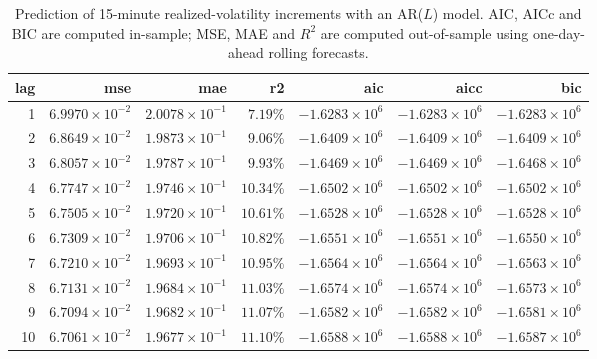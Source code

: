 \documentclass[ecta,nameyear,draft]{econsocart}
\newcommand{\1}{\mathbf 1}
\numberwithin{equation}{section}
\begin{document}
\begin{table}[htbp]
\centering

\begin{tabular}{rrrrrrr}
\toprule
lag & mse & mae & r2 & aic & aicc & bic \\
\midrule
1  & $6.9970 \times 10^{-2}$ & $2.0078 \times 10^{-1}$ & $7.19\%$  & $-1.6283 \times 10^{6}$ & $-1.6283 \times 10^{6}$ & $-1.6283 \times 10^{6}$ \\
2  & $6.8649 \times 10^{-2}$ & $1.9873 \times 10^{-1}$ & $9.06\%$  & $-1.6409 \times 10^{6}$ & $-1.6409 \times 10^{6}$ & $-1.6409 \times 10^{6}$ \\
3  & $6.8057 \times 10^{-2}$ & $1.9787 \times 10^{-1}$ & $9.93\%$  & $-1.6469 \times 10^{6}$ & $-1.6469 \times 10^{6}$ & $-1.6468 \times 10^{6}$ \\
4  & $6.7747 \times 10^{-2}$ & $1.9746 \times 10^{-1}$ & $10.34\%$ & $-1.6502 \times 10^{6}$ & $-1.6502 \times 10^{6}$ & $-1.6502 \times 10^{6}$ \\
5  & $6.7505 \times 10^{-2}$ & $1.9720 \times 10^{-1}$ & $10.61\%$ & $-1.6528 \times 10^{6}$ & $-1.6528 \times 10^{6}$ & $-1.6528 \times 10^{6}$ \\
6  & $6.7309 \times 10^{-2}$ & $1.9706 \times 10^{-1}$ & $10.82\%$ & $-1.6551 \times 10^{6}$ & $-1.6551 \times 10^{6}$ & $-1.6550 \times 10^{6}$ \\
7  & $6.7210 \times 10^{-2}$ & $1.9693 \times 10^{-1}$ & $10.95\%$ & $-1.6564 \times 10^{6}$ & $-1.6564 \times 10^{6}$ & $-1.6563 \times 10^{6}$ \\
8  & $6.7131 \times 10^{-2}$ & $1.9684 \times 10^{-1}$ & $11.03\%$ & $-1.6574 \times 10^{6}$ & $-1.6574 \times 10^{6}$ & $-1.6573 \times 10^{6}$ \\
9  & $6.7094 \times 10^{-2}$ & $1.9682 \times 10^{-1}$ & $11.07\%$ & $-1.6582 \times 10^{6}$ & $-1.6582 \times 10^{6}$ & $-1.6581 \times 10^{6}$ \\
10 & $6.7061 \times 10^{-2}$ & $1.9677 \times 10^{-1}$ & $11.10\%$ & $-1.6588 \times 10^{6}$ & $-1.6588 \times 10^{6}$ & $-1.6587 \times 10^{6}$ \\
\bottomrule
\end{tabular}

\caption{Prediction of 15-minute realized-volatility increments with an AR($L$) model. AIC, AICc and BIC are computed in-sample; MSE, MAE and $R^2$ are computed out-of-sample using one-day-ahead rolling forecasts.}
\label{tab:prediction_lags}
\end{table}
\end{document}
